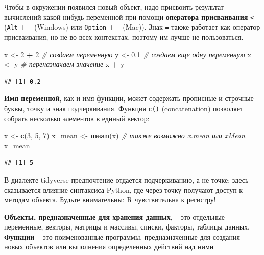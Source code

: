 \documentclass[
]{book}
\newenvironment{Shaded}{\begin{snugshade}}{\end{snugshade}}
\newcommand{\CommentTok}[1]{\textcolor[rgb]{0.56,0.35,0.01}{\textit{#1}}}
\newcommand{\DecValTok}[1]{\textcolor[rgb]{0.00,0.00,0.81}{#1}}
\newcommand{\FloatTok}[1]{\textcolor[rgb]{0.00,0.00,0.81}{#1}}
\newcommand{\FunctionTok}[1]{\textcolor[rgb]{0.13,0.29,0.53}{\textbf{#1}}}
\newcommand{\NormalTok}[1]{#1}
\newcommand{\OtherTok}[1]{\textcolor[rgb]{0.56,0.35,0.01}{#1}}
\newcommand{\SpecialCharTok}[1]{\textcolor[rgb]{0.81,0.36,0.00}{\textbf{#1}}}
\theoremstyle{definition}
\theoremstyle{definition}
\theoremstyle{definition}
\theoremstyle{definition}
\theoremstyle{remark}
\begin{document}
Чтобы в окружении появился новый объект, надо присвоить результат вычислений какой-нибудь переменной при помощи \textbf{оператора присваивания} \texttt{\textless{}-} (\texttt{Alt} + \texttt{-} (Windows) или \texttt{Option} + \texttt{-} (Mac)). Знак \texttt{=} также работает как оператор присваивания, но не во всех контекстах, поэтому им лучше не пользоваться.

\begin{Shaded}
\begin{Highlighting}[]
\NormalTok{x }\OtherTok{\textless{}{-}} \DecValTok{2} \SpecialCharTok{+} \DecValTok{2} \CommentTok{\# создаем переменную}
\NormalTok{y }\OtherTok{\textless{}{-}} \FloatTok{0.1} \CommentTok{\# создаем еще одну переменную}
\NormalTok{x }\OtherTok{\textless{}{-}}\NormalTok{ y }\CommentTok{\# переназначаем значение }
\NormalTok{x }\SpecialCharTok{+}\NormalTok{ y}
\end{Highlighting}
\end{Shaded}

\begin{verbatim}
## [1] 0.2
\end{verbatim}

\textbf{Имя переменной}, как и имя функции, может содержать прописные и строчные буквы, точку и знак подчеркивания. Функция \texttt{c()} (concatenation) позволяет собрать несколько элементов в единый вектор:

\begin{Shaded}
\begin{Highlighting}[]
\NormalTok{x }\OtherTok{\textless{}{-}} \FunctionTok{c}\NormalTok{(}\DecValTok{3}\NormalTok{, }\DecValTok{5}\NormalTok{, }\DecValTok{7}\NormalTok{)}
\NormalTok{x\_mean }\OtherTok{\textless{}{-}} \FunctionTok{mean}\NormalTok{(x) }\CommentTok{\# также возможно x.mean или xMean}
\NormalTok{x\_mean}
\end{Highlighting}
\end{Shaded}

\begin{verbatim}
## [1] 5
\end{verbatim}

В диалекте tidyverse предпочтение отдается подчеркиванию, а не точке; здесь сказывается влияние синтаксиса Python, где через точку получают доступ к методам объекта. Будьте внимательны: R чувствительна к регистру!

\textbf{Объекты, предназначенные для хранения данных}, -- это отдельные переменные, векторы, матрицы и массивы, списки, факторы, таблицы данных. \textbf{Функции} -- это поименованные программы, предназначенные для создания новых объектов или выполнения определенных действий над ними \citep[24]{мастицкий2015}
\end{document}
